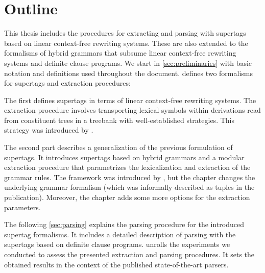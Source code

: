 \documentclass[../document.tex]{subfiles}
\begin{document}
    \section*{Outline}
    This thesis includes the procedures for extracting and parsing with supertags based on linear context-free rewriting systems.
    These are also extended to the formalisms of hybrid grammars that subsume linear context-free rewriting systems and definite clause programs.
    We start in \cref{sec:preliminaries} with basic notation and definitions used throughout the document.
     defines two formalisms for supertags and extraction procedures:
    \begin{compactitem}
        \item The first defines supertags in terms of linear context-free rewriting systems.
            The extraction procedure involves transporting lexical symbols within derivations read from constituent trees in a treebank with well-established strategies.
            This strategy was introduced by \citet{RupMoe21}.
        \item The second part describes a generalization of the previous formulation of supertags.
            It introduces supertags based on hybrid grammars and a modular extraction procedure that parametrizes the lexicalization and extraction of the grammar rules.
            The framework was introduced by \citet{Rup22}, but the chapter changes the underlying grammar formalism (which was informally described as tuples in the publication).
            Moreover, the chapter adds some more options for the extraction parameters.
    \end{compactitem}
    The following \cref{sec:parsing} explains the parsing procedure for the introduced supertag formalisms.
    It includes a detailed description of parsing with the supertags based on definite clause programs.
     unrolls the experiments we conducted to assess the presented extraction and parsing procedures.
    It sets the obtained results in the context of the published state-of-the-art parsers.
    
    \ifSubfilesClassLoaded{%
        \printindex
    }{}
\end{document}
